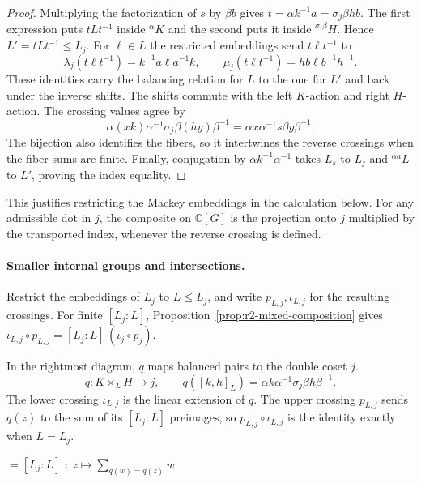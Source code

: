 \documentclass[11pt,a4paper]{article}
\numberwithin{equation}{section}
\theoremstyle{definition}
\newcommand{\C}{\mathbb C}
\newcommand{\cg}[2]{{}^{#1}\!#2}
\begin{document}
\begin{proof}
Multiplying the factorization of \(s\) by \(\beta b\) gives
\(t=\alpha k^{-1}a=\sigma_j\beta hb\). The first expression puts
\(tLt^{-1}\) inside \(\cg{\alpha}{K}\) and the second puts it inside
\(\cg{\sigma_j\beta}{H}\). Hence \(L'=tLt^{-1}\le L_j\).
For \(\ell\in L\) the restricted embeddings send \(t\ell t^{-1}\) to
\[
 \lambda_j(t\ell t^{-1})=k^{-1}a\ell a^{-1}k,\qquad
 \mu_j(t\ell t^{-1})=hb\ell b^{-1}h^{-1}.
\]
These identities carry the balancing relation for \(L\) to the one
for \(L'\) and back under the inverse shifts. The shifts commute with
the left \(K\)-action and right \(H\)-action. The crossing values agree
by
\[
 \alpha(xk)\alpha^{-1}\sigma_j\beta(hy)\beta^{-1}
 =\alpha x\alpha^{-1}s\beta y\beta^{-1}.
\]
The bijection also identifies the fibers, so it intertwines the
reverse crossings when the fiber sums are finite.
Finally, conjugation by \(\alpha k^{-1}\alpha^{-1}\) takes \(L_s\)
to \(L_j\) and \(\cg{\alpha a}{L}\) to \(L'\), proving the index equality.
\end{proof}

This justifies restricting the Mackey embeddings in the calculation
below. For any admissible dot in \(j\), the composite on \(\C[G]\)
is the projection onto \(j\) multiplied by the transported index,
whenever the reverse crossing is defined.


\paragraph{Smaller internal groups and intersections.}
Restrict the embeddings of \(L_j\) to \(L\le L_j\), and write
\(p_{L,j},\iota_{L,j}\) for the resulting crossings. For finite
\([L_j:L]\), Proposition~\ref{prop:r2-mixed-composition} gives
\(\iota_{L,j}\circ p_{L,j}=[L_j:L]\,(\iota_j\circ p_j)\).

In the rightmost diagram, \(q\) maps balanced pairs to the double coset \(j\).
\[
 q:K\times_L H\longrightarrow j,\qquad
 q([k,h]_L)=\alpha k\alpha^{-1}\sigma_j\beta h\beta^{-1}.
\]
The lower crossing \(\iota_{L,j}\) is the linear extension of \(q\).
The upper crossing \(p_{L,j}\) sends \(q(z)\) to the sum of its
\([L_j:L]\) preimages, so \(p_{L,j}\circ\iota_{L,j}\) is the
identity exactly when \(L=L_j\).

\begin{center}
 \hspace{2mm}\(=[L_j:L]\)\hspace{2mm}
 \hspace{9mm}
   {}{}
 \hspace{2mm}\(\displaystyle :\ z\mapsto\sum_{q(w)=q(z)}w\)
\end{center}
\end{document}
